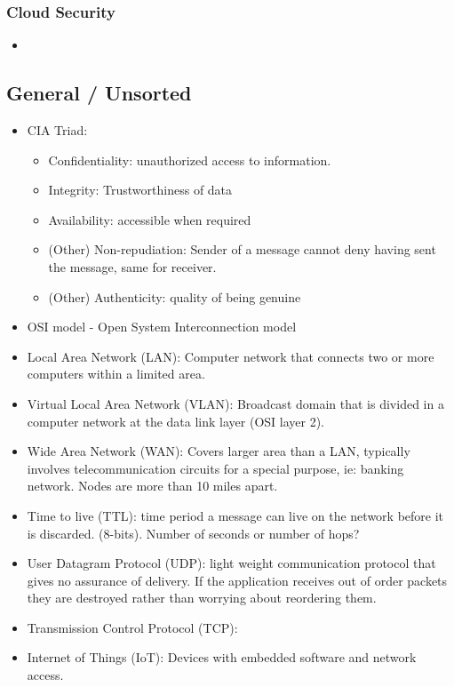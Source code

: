 \subsubsection{Cloud Security}
\begin{itemize}
    \item 
\end{itemize}

\subsection{General / Unsorted}
\begin{itemize}
    \item CIA Triad:
    \begin{itemize}
        \item Confidentiality: unauthorized access to information.
        \item Integrity: Trustworthiness of data
        \item Availability: accessible when required
        \item (Other) Non-repudiation: Sender of a message cannot deny having sent the message, same for receiver.
        \item (Other) Authenticity: quality of being genuine
    \end{itemize}
    \item OSI model - Open System Interconnection model
    \item Local Area Network (LAN): Computer network that connects two or more computers within a limited area.
    \item Virtual Local Area Network (VLAN): Broadcast domain that is divided in a computer network at the data link layer (OSI layer 2).
    \item Wide Area Network (WAN): Covers larger area than a LAN, typically involves telecommunication circuits for a special purpose, ie: banking network. Nodes are more than 10 miles apart.
    \item Time to live (TTL): time period a message can live on the network before it is discarded. (8-bits). Number of seconds or number of hops?
    \item User Datagram Protocol (UDP): light weight communication protocol that gives no assurance of delivery.
    If the application receives out of order packets they are destroyed rather than worrying about reordering them.
    \item Transmission Control Protocol (TCP):
    \item Internet of Things (IoT): Devices with embedded software and network access.
   

\end{itemize}
